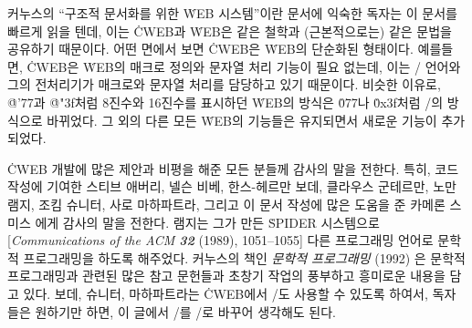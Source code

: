 커누스의 ``구조적 문서화를 위한 \.{WEB} 시스템''이란 문서에 익숙한
독자는 이 문서를 빠르게 읽을 텐데, 이는 
\.{CWEB}과 \.{WEB}은 같은 철학과 (근본적으로는) 
같은 문법을 공유하기 때문이다. 어떤 면에서 보면 \.{CWEB}은
\.{WEB}의 단순화된 형태이다. 예를들면, \.{CWEB}은 \.{WEB}의 매크로
정의와 문자열 처리 기능이 필요 없는데, 이는 \CEE/ 언어와 그의
 전처리기가 매크로와 문자열 처리를 담당하고 있기 때문이다.
비슷한 이유로, \.{@'77}과 \.{@"3f}처럼 8진수와 16진수를 표시하던 
\.{WEB}의 방식은 \.{077}나 \.{0x3f}처럼 \CEE/의 방식으로 바뀌었다.
그 외의 다른 모든 \.{WEB}의 기능들은 유지되면서 새로운 기능이 추가되었다.

\.{CWEB} 개발에 많은 제안과 비평을 해준 모든 분들께 감사의
말을 전한다. 특히, 코드 작성에 기여한 스티브 애버리, 넬슨 비베,
한스-헤르만 보데, 클라우스 군테르만, 노만 램지, 조킴 슈니터, 사로
마하파트라, 그리고 이 문서 작성에 많은 도움을 준 카메론 스미스 
에게 감사의 말을 전한다. 램지는 그가 만든 \.{SPIDER} 시스템으로
[{\sl Communications of the ACM\/ \bf32} (1989), 1051--1055]
다른 프로그래밍 언어로 문학적 프로그래밍을 하도록 
해주었다. 커누스의 책인 {\sl 문학적 프로그래밍\/} (1992) 은  
문학적 프로그래밍과 관련된 많은 참고 문헌들과 초창기 작업의 풍부하고
흥미로운 내용을 담고 있다. 보데, 슈니터, 마하파트라는 \.{CWEB}에서
\CPLUSPLUS/도 사용할 수 있도록 하여서, 독자들은 원하기만 하면,
이 글에서 \CEE/를 \CPLUSPLUS/로 바꾸어 생각해도 된다.

